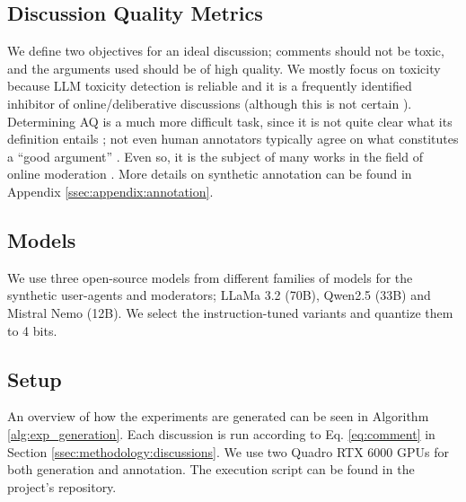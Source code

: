 \subsection{Discussion Quality Metrics}
\label{ssec:experimental:metrics}

We define two objectives for an ideal discussion; comments should not be toxic, and the arguments used should be of high quality. We mostly focus on toxicity because \ac{LLM} toxicity detection is reliable \citep{kang-qian-2024-implanting, Wang2022ToxicityDW, anjum2024hate} and it is a frequently identified inhibitor of online/deliberative discussions \citep{dekock2022disagree, XiaToxicity} (although this is not certain \citep{Avalle2024PersistentIP}). Determining \ac{AQ} is a much more difficult task, since it is not quite clear what its definition entails \cite{korre2025evaluation}; not even human annotators typically agree on what constitutes a “good argument” \cite{argyle2023}. Even so, it is the subject of many works in the field of online moderation \cite{argyle2023, schroeder-etal-2024-fora, falk-etal-2024-moderation, falk-etal-2021-predicting}. More details on synthetic annotation can be found in Appendix \ref{ssec:appendix:annotation}.


\subsection{Models}
\label{ssec:experimental:model}

We use three open-source models from different families of models for the synthetic user-agents and moderators; LLaMa 3.2 (70B), Qwen2.5 (33B) and Mistral Nemo (12B). We select the instruction-tuned variants and quantize them to 4 bits.


\subsection{Setup}

An overview of how the experiments are generated can be seen in Algorithm \ref{alg:exp_generation}. Each discussion is run according to Eq. \ref{eq:comment} in Section \ref{ssec:methodology:discussions}. We use two Quadro RTX 6000 GPUs for both generation and annotation. The execution script can be found in the project's repository\analysislink.

